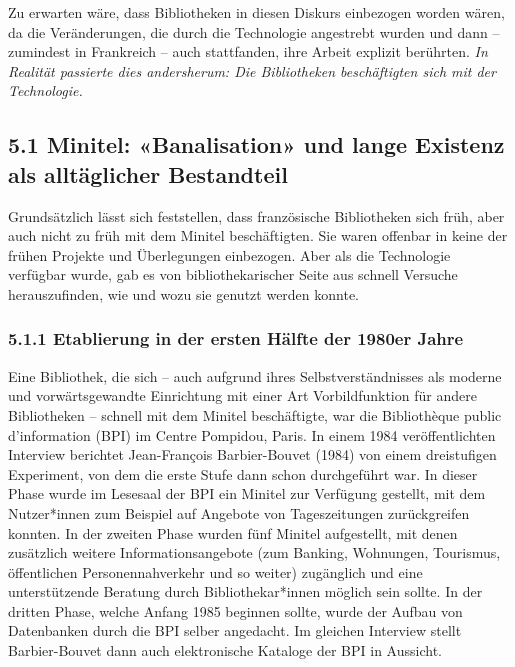 \documentclass[a4paper,
fontsize=11pt,
oneside,
numbers=noperiodatend,
parskip=half-,
bibliography=totoc,
final
]{scrartcl}
\begin{document}
Zu erwarten wäre, dass Bibliotheken in diesen Diskurs einbezogen worden
wären, da die Veränderungen, die durch die Technologie angestrebt wurden
und dann -- zumindest in Frankreich -- auch stattfanden, ihre Arbeit
explizit berührten. \emph{In Realität passierte dies andersherum: Die
Bibliotheken beschäftigten sich mit der Technologie.}

\hypertarget{minitel-banalisation-und-lange-existenz-als-alltuxe4glicher-bestandteil}{%
\subsection{5.1 Minitel: «Banalisation» und lange Existenz als
alltäglicher
Bestandteil}\label{minitel-banalisation-und-lange-existenz-als-alltuxe4glicher-bestandteil}}

Grundsätzlich lässt sich feststellen, dass französische Bibliotheken
sich früh, aber auch nicht zu früh mit dem Minitel beschäftigten. Sie
waren offenbar in keine der frühen Projekte und Überlegungen einbezogen.
Aber als die Technologie verfügbar wurde, gab es von bibliothekarischer
Seite aus schnell Versuche herauszufinden, wie und wozu sie genutzt
werden konnte.

\hypertarget{etablierung-in-der-ersten-huxe4lfte-der-1980er-jahre}{%
\subsubsection{5.1.1 Etablierung in der ersten Hälfte der 1980er
Jahre}\label{etablierung-in-der-ersten-huxe4lfte-der-1980er-jahre}}

Eine Bibliothek, die sich -- auch aufgrund ihres Selbstverständnisses
als moderne und vorwärtsgewandte Einrichtung mit einer Art
Vorbildfunktion für andere Bibliotheken -- schnell mit dem Minitel
beschäftigte, war die Bibliothèque public d'information (BPI) im Centre
Pompidou, Paris. In einem 1984 veröffentlichten Interview berichtet
Jean-François Barbier-Bouvet (1984) von einem dreistufigen Experiment,
von dem die erste Stufe dann schon durchgeführt war. In dieser Phase
wurde im Lesesaal der BPI ein Minitel zur Verfügung gestellt, mit dem
Nutzer*innen zum Beispiel auf Angebote von Tageszeitungen zurückgreifen
konnten. In der zweiten Phase wurden fünf Minitel aufgestellt, mit denen
zusätzlich weitere Informationsangebote (zum Banking, Wohnungen,
Tourismus, öffentlichen Personennahverkehr und so weiter) zugänglich und
eine unterstützende Beratung durch Bibliothekar*innen möglich sein
sollte. In der dritten Phase, welche Anfang 1985 beginnen sollte, wurde
der Aufbau von Datenbanken durch die BPI selber angedacht. Im gleichen
Interview stellt Barbier-Bouvet dann auch elektronische Kataloge der BPI
in Aussicht.
\end{document}
